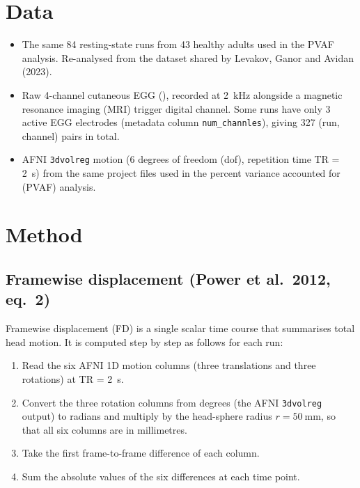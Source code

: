 \documentclass[11pt]{article}
\begin{document}
\clearpage

\section{Data}

\begin{itemize}
\item The same 84 resting-state runs from 43 healthy adults used in the
PVAF analysis. Re-analysed from the dataset shared by Levakov, Ganor
and Avidan (2023).
\item Raw 4-channel cutaneous EGG
(), recorded at 2~kHz
alongside a magnetic resonance imaging (MRI) trigger digital channel.
Some runs have only 3 active EGG electrodes (metadata column
\texttt{num\_channles}), giving 327 (run, channel) pairs in total.
\item AFNI \texttt{3dvolreg} motion (6 degrees of freedom (dof),
repetition time TR = 2~s) from the same project files used in the
percent variance accounted for (PVAF) analysis.
\end{itemize}

\section{Method}

\subsection{Framewise displacement (Power et al.\ 2012, eq.~2)}

Framewise displacement (FD) is a single scalar time course that
summarises total head motion. It is computed step by step as follows
for each run:
\begin{enumerate}
\item Read the six AFNI 1D motion columns (three translations and
three rotations) at TR = 2~s.
\item Convert the three rotation columns from degrees (the AFNI
\texttt{3dvolreg} output) to radians and multiply by the head-sphere
radius $r = \SI{50}{\milli\meter}$, so that all six columns are in
millimetres.
\item Take the first frame-to-frame difference of each column.
\item Sum the absolute values of the six differences at each time
point.
\end{enumerate}
\end{document}
